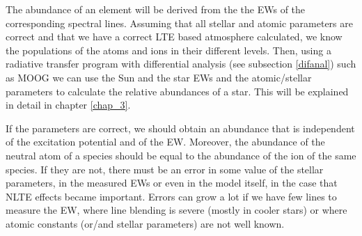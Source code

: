 \documentclass[dvips,12pt,a4paper]{report}
\begin{document}
{The abundance of an element will be derived from the the EWs of the corresponding spectral lines. %
Assuming that all stellar and atomic parameters are correct and that we have a correct LTE based atmosphere calculated, we know the populations of the atoms and ions in their different levels. Then, using a radiative transfer program with differential analysis (see subsection \ref{difanal}) such as MOOG \citep{Sneden-1973} we can use the Sun and the star EWs and the atomic/stellar parameters to calculate the relative abundances of a star. This will be explained in detail in chapter \ref{chap_3}.

If the parameters are correct, we should obtain an abundance that is independent of the excitation potential and of the EW. Moreover, the abundance of the neutral atom of a species should be equal to the abundance of the ion of the same species. If they are not, there must be an error in some value of the stellar parameters, in the measured EWs or even in the model itself, in the case that NLTE effects became important. Errors can grow a lot if we have few lines to measure the EW, where line blending is severe (mostly in cooler stars) or where atomic constants (or/and stellar parameters) are not well known.






}
\end{document}
